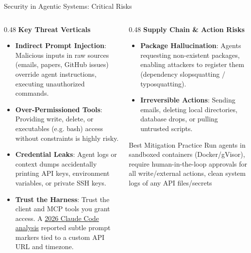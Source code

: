\begin{frame}[shrink=15]{Security in Agentic Systems: Critical Risks}
  \begin{columns}[T, onlytextwidth]
    \begin{column}{0.48\textwidth}
      \textbf{Key Threat Verticals}
      \begin{itemize}\setlength{\itemsep}{2pt}
        \item \textbf{Indirect Prompt Injection}: Malicious inputs in raw sources (emails, papers, GitHub issues) override agent instructions, executing unauthorized commands.
        \item \textbf{Over-Permissioned Tools}: Providing write, delete, or executables (e.g. bash) access without constraints is highly risky.
        \item \textbf{Credential Leaks}: Agent logs or context dumps accidentally printing API keys, environment variables, or private SSH keys.
        \item \textbf{Trust the Harness}: Trust the client and MCP tools you grant access. A \href{https://thereallo.dev/blog/claude-code-prompt-steganography\#marker}{2026 Claude Code analysis} reported subtle prompt markers tied to a custom API URL and timezone.
      \end{itemize}
    \end{column}
    \hfill
    \begin{column}{0.48\textwidth}
      \textbf{Supply Chain \& Action Risks}
      \begin{itemize}\setlength{\itemsep}{2pt}
        \item \textbf{Package Hallucination}: Agents requesting non-existent packages, enabling attackers to register them (dependency slopsquatting / typosquatting).
        \item \textbf{Irreversible Actions}: Sending emails, deleting local directories, database drops, or pulling untrusted scripts.
      \end{itemize}
      \vspace{0.4em}
      \begin{alertblock}{Best Mitigation Practice}
        Run agents in sandboxed containers (Docker/gVisor), require human-in-the-loop approvals for all write/external actions, clean system logs of any API files/secrets
      \end{alertblock}
    \end{column}
  \end{columns}
\end{frame}

